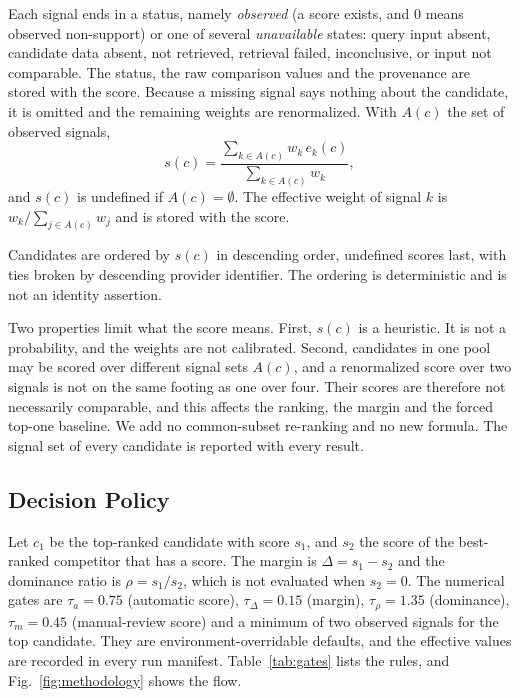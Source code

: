 Each signal ends in a status, namely \emph{observed} (a score exists, and 0 means observed non-support) or one of several \emph{unavailable} states: query input absent, candidate data absent, not retrieved, retrieval failed, inconclusive, or input not comparable. The status, the raw comparison values and the provenance are stored with the score. Because a missing signal says nothing about the candidate, it is omitted and the remaining weights are renormalized. With $A(c)$ the set of observed signals,
\begin{equation}
s(c)=\frac{\sum_{k\in A(c)} w_k\,e_k(c)}{\sum_{k\in A(c)} w_k},
\label{eq:score}
\end{equation}
and $s(c)$ is undefined if $A(c)=\emptyset$. The effective weight of signal $k$ is $w_k/\sum_{j\in A(c)}w_j$ and is stored with the score.

Candidates are ordered by $s(c)$ in descending order, undefined scores last, with ties broken by descending provider identifier. The ordering is deterministic and is not an identity assertion.

Two properties limit what the score means. First, $s(c)$ is a heuristic. It is not a probability, and the weights are not calibrated. Second, candidates in one pool may be scored over different signal sets $A(c)$, and a renormalized score over two signals is not on the same footing as one over four. Their scores are therefore not necessarily comparable, and this affects the ranking, the margin and the forced top-one baseline. We add no common-subset re-ranking and no new formula. The signal set of every candidate is reported with every result.

\subsection{Decision Policy}
\label{sec:policy}
Let $c_1$ be the top-ranked candidate with score $s_1$, and $s_2$ the score of the best-ranked competitor that has a score. The margin is $\Delta=s_1-s_2$ and the dominance ratio is $\rho=s_1/s_2$, which is not evaluated when $s_2=0$. The numerical gates are $\tau_a=0.75$ (automatic score), $\tau_\Delta=0.15$ (margin), $\tau_\rho=1.35$ (dominance), $\tau_m=0.45$ (manual-review score) and a minimum of two observed signals for the top candidate. They are environment-overridable defaults, and the effective values are recorded in every run manifest. Table~\ref{tab:gates} lists the rules, and Fig.~\ref{fig:methodology} shows the flow.

